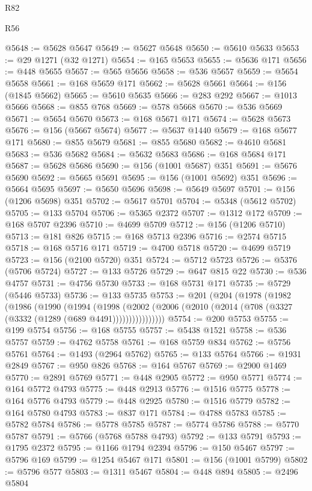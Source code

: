 \begin{lexlean}{R82}
\begin{lexlean}{R56}
\begin{coremodule}
{{{{{{{{{{{{{{{{{{{{{{{{{{{{{{{{{{{{{{{{{{{{{{{{{{{{{{{{{{{{{{{{{{{{{{{{{{{{{{{{{{{{{{{{{{{{{{{{{{{{{{{{{{{{{{{{{{{{{{{{{{{{{{{{{{{{{{{{{{{{{{{{{{{{{{{{{{{{{{{{{{{{{{{{{{{{{{{{{{{{{{{{{{{{{{{{{{{{{{{{{{{{{{{{{{{@5648 := @5628 @5647
@5649 := @5627 @5648
@5650 := @5610 @5633
@5653 := @29 @1271 (@32 @1271)
@5654 := @165 @5653
@5655 := @5636 @171
@5656 := @448 @5655
@5657 := @565 @5656
@5658 := @536 @5657
@5659 := @5654 @5658
@5661 := @168 @5659 @171
@5662 := @5628 @5661
@5664 := @156 (@1845 @5662)
@5665 := @5610 @5635
@5666 := @283 @292
@5667 := @1013 @5666
@5668 := @855 @768
@5669 := @578 @5668
@5670 := @536 @5669
@5671 := @5654 @5670
@5673 := @168 @5671 @171
@5674 := @5628 @5673
@5676 := @156 (@5667 @5674)
@5677 := @5637 @1440
@5679 := @168 @5677 @171
@5680 := @855 @5679
@5681 := @855 @5680
@5682 := @4610 @5681
@5683 := @536 @5682
@5684 := @5632 @5683
@5686 := @168 @5684 @171
@5687 := @5628 @5686
@5690 := @156 (@1001 @5687) @351
@5691 := @5676 @5690
@5692 := @5665 @5691
@5695 := @156 (@1001 @5692) @351
@5696 := @5664 @5695
@5697 := @5650 @5696
@5698 := @5649 @5697
@5701 := @156 (@1206 @5698) @351
@5702 := @5617 @5701
@5704 := @5348 (@5612 @5702)
@5705 := @133 @5704
@5706 := @5365 @2372
@5707 := @1312 @172
@5709 := @168 @5707 @2396
@5710 := @4699 @5709
@5712 := @156 (@1206 @5710)
@5713 := @181 @826
@5715 := @168 @5713 @2396
@5716 := @2574 @5715
@5718 := @168 @5716 @171
@5719 := @4700 @5718
@5720 := @4699 @5719
@5723 := @156 (@2100 @5720) @351
@5724 := @5712 @5723
@5726 := @5376 (@5706 @5724)
@5727 := @133 @5726
@5729 := @647 @815 @22
@5730 := @536 @4757
@5731 := @4756 @5730
@5733 := @168 @5731 @171
@5735 := @5729 (@5446 @5733)
@5736 := @133 @5735
@5753 := @201
    (@204
      (@1978
        (@1982
          (@1986
            (@1990
              (@1994
                (@1998
                  (@2002 (@2006 (@2010 (@2014 (@708 (@3327 (@3332 (@1289 (@689 @4491))))))))))))))))
@5754 := @200 @5753
@5755 := @199 @5754
@5756 := @168 @5755
@5757 := @5438 @1521
@5758 := @536 @5757
@5759 := @4762 @5758
@5761 := @168 @5759 @834
@5762 := @5756 @5761
@5764 := @1493 (@2964 @5762)
@5765 := @133 @5764
@5766 := @1931 @2849
@5767 := @950 @826
@5768 := @164 @5767
@5769 := @2900 @1469
@5770 := @2891 @5769
@5771 := @448 @2905
@5772 := @950 @5771
@5774 := @164 @5772 @4793
@5775 := @448 @2913
@5776 := @1516 @5775
@5778 := @164 @5776 @4793
@5779 := @448 @2925
@5780 := @1516 @5779
@5782 := @164 @5780 @4793
@5783 := @837 @171
@5784 := @4788 @5783
@5785 := @5782 @5784
@5786 := @5778 @5785
@5787 := @5774 @5786
@5788 := @5770 @5787
@5791 := @5766 (@5768 @5788 @4793)
@5792 := @133 @5791
@5793 := @1795 @2372
@5795 := @1166 @1794 @2394
@5796 := @150 @5467
@5797 := @5796 @169
@5799 := @1254 @5467 @171
@5801 := @156 (@1001 @5799)
@5802 := @5796 @577
@5803 := @1311 @5467
@5804 := @448 @894
@5805 := @2496 @5804
}}}}}}}}}}}}}}}}}}}}}}}}}}}}}}}}}}}}}}}}}}}}}}}}}}}}}}}}}}}}}}}}}}}}}}}}}}}}}}}}}}}}}}}}}}}}}}}}}}}}}}}}}}}}}}}}}}}}}}}}}}}}}}}}}}}}}}}}}}}}}}}}}}}}}}}}}}}}}}}}}}}}}}}}}}}}}}}}}}}}}}}}}}}}}}}}}}}}}}}}}}}}}}}}}}}
\end{coremodule}
\end{lexlean}
\end{lexlean}

